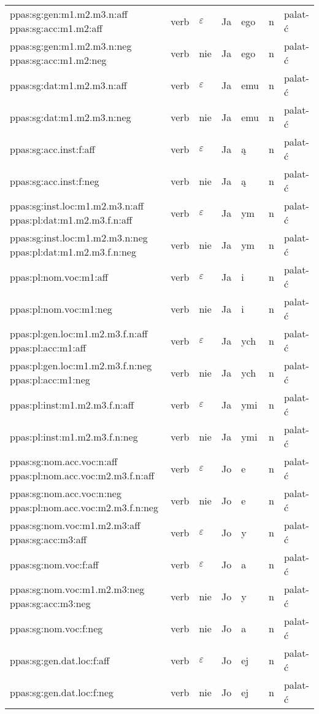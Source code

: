 \documentclass{article}
\begin{document}
\begin{longtable}{p{7cm}|l|l|l|l|l|l}
ppas:sg:gen:m1.m2.m3.n:aff ppas:sg:acc:m1.m2:aff & verb & $\varepsilon$ & Ja & ego & n & palat-ć\\
ppas:sg:gen:m1.m2.m3.n:neg ppas:sg:acc:m1.m2:neg & verb & nie & Ja & ego & n & palat-ć\\
ppas:sg:dat:m1.m2.m3.n:aff & verb & $\varepsilon$ & Ja & emu & n & palat-ć\\
ppas:sg:dat:m1.m2.m3.n:neg & verb & nie & Ja & emu & n & palat-ć\\
ppas:sg:acc.inst:f:aff & verb & $\varepsilon$ & Ja & ą & n & palat-ć\\
ppas:sg:acc.inst:f:neg & verb & nie & Ja & ą & n & palat-ć\\
ppas:sg:inst.loc:m1.m2.m3.n:aff ppas:pl:dat:m1.m2.m3.f.n:aff & verb & $\varepsilon$ & Ja & ym & n & palat-ć\\
ppas:sg:inst.loc:m1.m2.m3.n:neg ppas:pl:dat:m1.m2.m3.f.n:neg & verb & nie & Ja & ym & n & palat-ć\\
ppas:pl:nom.voc:m1:aff & verb & $\varepsilon$ & Ja & i & n & palat-ć\\
ppas:pl:nom.voc:m1:neg & verb & nie & Ja & i & n & palat-ć\\
ppas:pl:gen.loc:m1.m2.m3.f.n:aff ppas:pl:acc:m1:aff & verb & $\varepsilon$ & Ja & ych & n & palat-ć\\
ppas:pl:gen.loc:m1.m2.m3.f.n:neg ppas:pl:acc:m1:neg & verb & nie & Ja & ych & n & palat-ć\\
ppas:pl:inst:m1.m2.m3.f.n:aff & verb & $\varepsilon$ & Ja & ymi & n & palat-ć\\
ppas:pl:inst:m1.m2.m3.f.n:neg & verb & nie & Ja & ymi & n & palat-ć\\
ppas:sg:nom.acc.voc:n:aff ppas:pl:nom.acc.voc:m2.m3.f.n:aff & verb & $\varepsilon$ & Jo & e & n & palat-ć\\
ppas:sg:nom.acc.voc:n:neg ppas:pl:nom.acc.voc:m2.m3.f.n:neg & verb & nie & Jo & e & n & palat-ć\\
ppas:sg:nom.voc:m1.m2.m3:aff ppas:sg:acc:m3:aff & verb & $\varepsilon$ & Jo & y & n & palat-ć\\
ppas:sg:nom.voc:f:aff & verb & $\varepsilon$ & Jo & a & n & palat-ć\\
ppas:sg:nom.voc:m1.m2.m3:neg ppas:sg:acc:m3:neg & verb & nie & Jo & y & n & palat-ć\\
ppas:sg:nom.voc:f:neg & verb & nie & Jo & a & n & palat-ć\\
ppas:sg:gen.dat.loc:f:aff & verb & $\varepsilon$ & Jo & ej & n & palat-ć\\
ppas:sg:gen.dat.loc:f:neg & verb & nie & Jo & ej & n & palat-ć\\

\end{longtable}
\end{document}
